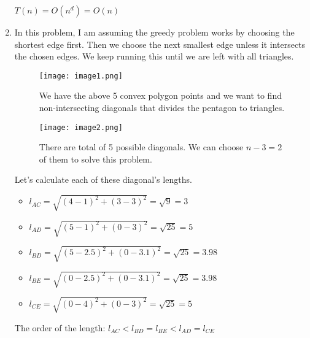 \documentclass{article}
\begin{document}
\begin{enumerate}
  \begin{center}
    $T(n)=O(n^d)=O(n)$
  \end{center}
  
  \item In this problem, I am assuming the greedy problem works by choosing the shortest edge first.
  Then we choose the next smallest edge unless it intersects the chosen edges.
  We keep running this until we are left with all triangles.

  \begin{figure}[H]
    \centering
    \begin{minipage}{0.4\textwidth}
      \centering
      \texttt{[image: image1.png]}
      \caption{We have the above 5 convex polygon points and we want to find non-intersecting diagonals that divides the pentagon to triangles.}
    \end{minipage}
    \hspace{1cm}
    \begin{minipage}{0.4\textwidth}
      \centering
      \texttt{[image: image2.png]}
      \caption{There are total of 5 possible diagonals. We can choose $n-3=2$ of them to solve this problem.}
    \end{minipage}
  \end{figure}

  Let's calculate each of these diagonal's lengths.

  \begin{itemize}
    \item $l_{AC}=\sqrt{(4-1)^2+(3-3)^2}=\sqrt{9}=3$
    \item $l_{AD}=\sqrt{(5-1)^2+(0-3)^2}=\sqrt{25}=5$
    \item $l_{BD}=\sqrt{(5-2.5)^2+(0-3.1)^2}=\sqrt{25}=3.98$
    \item $l_{BE}=\sqrt{(0-2.5)^2+(0-3.1)^2}=\sqrt{25}=3.98$
    \item $l_{CE}=\sqrt{(0-4)^2+(0-3)^2}=\sqrt{25}=5$
  \end{itemize}

  The order of the length: $l_{AC}<l_{BD}=l_{BE}<l_{AD}=l_{CE}$


\end{enumerate}
\end{document}
